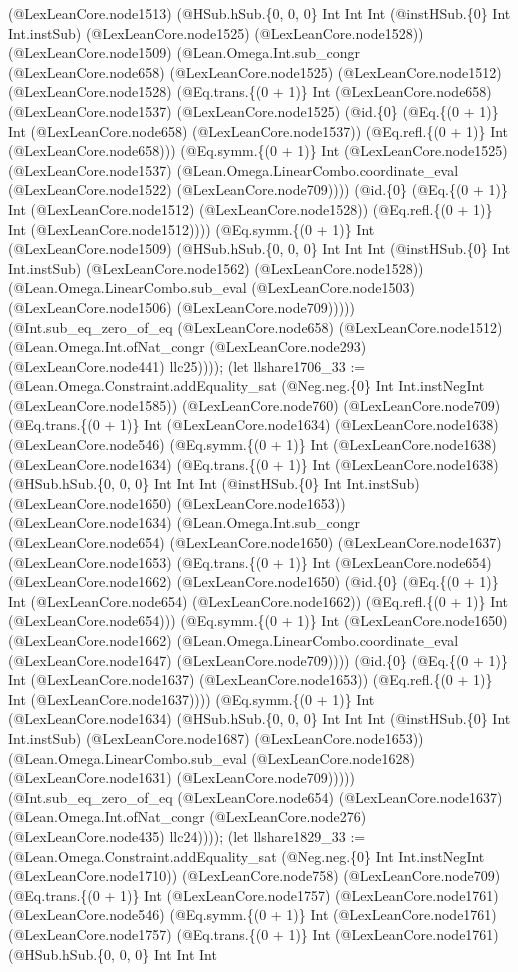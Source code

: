 \documentclass[11pt]{article}
\begin{document}
(@LexLeanCore.node1513) (@HSub.hSub.\{0, 0, 0\} Int Int Int (@instHSub.\{0\} Int Int.instSub) (@LexLeanCore.node1525) (@LexLeanCore.node1528)) (@LexLeanCore.node1509) (@Lean.Omega.Int.sub\_congr (@LexLeanCore.node658) (@LexLeanCore.node1525) (@LexLeanCore.node1512) (@LexLeanCore.node1528) (@Eq.trans.\{(0 + 1)\} Int (@LexLeanCore.node658) (@LexLeanCore.node1537) (@LexLeanCore.node1525) (@id.\{0\} (@Eq.\{(0 + 1)\} Int (@LexLeanCore.node658) (@LexLeanCore.node1537)) (@Eq.refl.\{(0 + 1)\} Int (@LexLeanCore.node658))) (@Eq.symm.\{(0 + 1)\} Int (@LexLeanCore.node1525) (@LexLeanCore.node1537) (@Lean.Omega.LinearCombo.coordinate\_eval (@LexLeanCore.node1522) (@LexLeanCore.node709)))) (@id.\{0\} (@Eq.\{(0 + 1)\} Int (@LexLeanCore.node1512) (@LexLeanCore.node1528)) (@Eq.refl.\{(0 + 1)\} Int (@LexLeanCore.node1512)))) (@Eq.symm.\{(0 + 1)\} Int (@LexLeanCore.node1509) (@HSub.hSub.\{0, 0, 0\} Int Int Int (@instHSub.\{0\} Int Int.instSub) (@LexLeanCore.node1562) (@LexLeanCore.node1528)) (@Lean.Omega.LinearCombo.sub\_eval (@LexLeanCore.node1503) (@LexLeanCore.node1506) (@LexLeanCore.node709))))) (@Int.sub\_eq\_zero\_of\_eq (@LexLeanCore.node658) (@LexLeanCore.node1512) (@Lean.Omega.Int.ofNat\_congr (@LexLeanCore.node293) (@LexLeanCore.node441) llc25)))); (let llshare1706\_33 := (@Lean.Omega.Constraint.addEquality\_sat (@Neg.neg.\{0\} Int Int.instNegInt (@LexLeanCore.node1585)) (@LexLeanCore.node760) (@LexLeanCore.node709) (@Eq.trans.\{(0 + 1)\} Int (@LexLeanCore.node1634) (@LexLeanCore.node1638) (@LexLeanCore.node546) (@Eq.symm.\{(0 + 1)\} Int (@LexLeanCore.node1638) (@LexLeanCore.node1634) (@Eq.trans.\{(0 + 1)\} Int (@LexLeanCore.node1638) (@HSub.hSub.\{0, 0, 0\} Int Int Int (@instHSub.\{0\} Int Int.instSub) (@LexLeanCore.node1650) (@LexLeanCore.node1653)) (@LexLeanCore.node1634) (@Lean.Omega.Int.sub\_congr (@LexLeanCore.node654) (@LexLeanCore.node1650) (@LexLeanCore.node1637) (@LexLeanCore.node1653) (@Eq.trans.\{(0 + 1)\} Int (@LexLeanCore.node654) (@LexLeanCore.node1662) (@LexLeanCore.node1650) (@id.\{0\} (@Eq.\{(0 + 1)\} Int (@LexLeanCore.node654) (@LexLeanCore.node1662)) (@Eq.refl.\{(0 + 1)\} Int (@LexLeanCore.node654))) (@Eq.symm.\{(0 + 1)\} Int (@LexLeanCore.node1650) (@LexLeanCore.node1662) (@Lean.Omega.LinearCombo.coordinate\_eval (@LexLeanCore.node1647) (@LexLeanCore.node709)))) (@id.\{0\} (@Eq.\{(0 + 1)\} Int (@LexLeanCore.node1637) (@LexLeanCore.node1653)) (@Eq.refl.\{(0 + 1)\} Int (@LexLeanCore.node1637)))) (@Eq.symm.\{(0 + 1)\} Int (@LexLeanCore.node1634) (@HSub.hSub.\{0, 0, 0\} Int Int Int (@instHSub.\{0\} Int Int.instSub) (@LexLeanCore.node1687) (@LexLeanCore.node1653)) (@Lean.Omega.LinearCombo.sub\_eval (@LexLeanCore.node1628) (@LexLeanCore.node1631) (@LexLeanCore.node709))))) (@Int.sub\_eq\_zero\_of\_eq (@LexLeanCore.node654) (@LexLeanCore.node1637) (@Lean.Omega.Int.ofNat\_congr (@LexLeanCore.node276) (@LexLeanCore.node435) llc24)))); (let llshare1829\_33 := (@Lean.Omega.Constraint.addEquality\_sat (@Neg.neg.\{0\} Int Int.instNegInt (@LexLeanCore.node1710)) (@LexLeanCore.node758) (@LexLeanCore.node709) (@Eq.trans.\{(0 + 1)\} Int (@LexLeanCore.node1757) (@LexLeanCore.node1761) (@LexLeanCore.node546) (@Eq.symm.\{(0 + 1)\} Int (@LexLeanCore.node1761) (@LexLeanCore.node1757) (@Eq.trans.\{(0 + 1)\} Int (@LexLeanCore.node1761) (@HSub.hSub.\{0, 0, 0\} Int Int Int 
\end{document}
